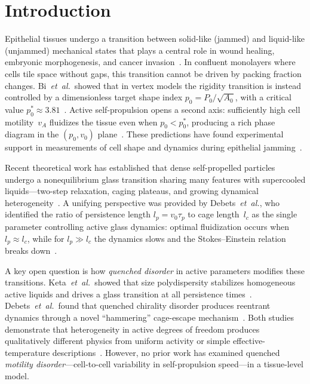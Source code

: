 \documentclass[aps,pre,twocolumn,superscriptaddress,longbibliography,floatfix]{revtex4-2}
\begin{document}
\maketitle

\section{Introduction}
\label{sec:intro}

Epithelial tissues undergo a transition between solid-like (jammed) and
liquid-like (unjammed) mechanical states that plays a central role in
wound healing, embryonic morphogenesis, and cancer
invasion~\cite{park2015,angelini2011,garcia2015}.  In confluent
monolayers where cells tile space without gaps, this transition cannot
be driven by packing fraction changes.  Bi~\textit{et~al.}\ showed that
in vertex models the rigidity transition is instead controlled by a
dimensionless target shape index $p_0 = P_0/\sqrt{A_0}$, with a
critical value $p_0^*\!\approx\!3.81$~\cite{bi2015}.  Active
self-propulsion opens a second axis: sufficiently high cell
motility~$v_A$ fluidizes the tissue even when $p_0\!<\!p_0^*$,
producing a rich phase diagram in the $(p_0, v_0)$
plane~\cite{bi2016,sussman2018}.  These predictions have found experimental
support in measurements of cell shape and dynamics during epithelial
jamming~\cite{atia2018,park2015}.

Recent theoretical work has established that dense self-propelled
particles undergo a nonequilibrium glass transition sharing many
features with supercooled liquids---two-step relaxation, caging
plateaus, and growing dynamical
heterogeneity~\cite{berthier2019,berthier2011,janssen2019,henkes2020}.  A
unifying perspective was provided by Debets~\textit{et~al.}, who
identified the ratio of persistence length $l_p = v_0\tau_p$ to cage
length~$l_c$ as the single parameter controlling active glass
dynamics: optimal fluidization occurs when $l_p\!\approx\!l_c$, while
for $l_p\!\gg\!l_c$ the dynamics slows and the Stokes--Einstein
relation breaks down~\cite{debets2021,debets2022}.

A key open question is how \emph{quenched disorder} in active
parameters modifies these transitions.  Keta~\textit{et~al.}\ showed
that size polydispersity stabilizes homogeneous active liquids and
drives a glass transition at all persistence
times~\cite{keta2022}.  Debets~\textit{et~al.}\ found that quenched
chirality disorder produces reentrant dynamics through a novel
``hammering'' cage-escape mechanism~\cite{debets2023}.  Both studies
demonstrate that heterogeneity in active degrees of freedom produces
qualitatively different physics from uniform activity or simple
effective-temperature descriptions~\cite{berthier2013}.  However, no
prior work has examined quenched \emph{motility disorder}---cell-to-cell
variability in self-propulsion speed---in a tissue-level model.
\end{document}
